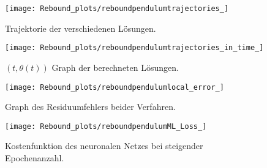 \begin{figure}
       \centering
       \texttt{[image: Rebound\_plots/reboundpendulumtrajectories\_]}
       \caption{Trajektorie der verschiedenen Lösungen.}
       \label{fig:rebound-trajectories}
\end{figure}

\begin{figure}
       \centering
       \texttt{[image: Rebound\_plots/reboundpendulumtrajectories\_in\_time\_]}
       \caption{$(t, \theta(t))$ Graph der berechneten Lösungen.}
       \label{fig:rebound-trajectories-in-time}
\end{figure}

\begin{figure}
       \centering
       \texttt{[image: Rebound\_plots/reboundpendulumlocal\_error\_]}
       \caption{Graph des Residuumfehlers beider Verfahren.}
       \label{fig:rebound-residuum}
\end{figure}

\begin{figure}
       \centering
       \texttt{[image: Rebound\_plots/reboundpendulumML\_Loss\_]}
       \caption{Kostenfunktion des neuronalen Netzes bei steigender Epochenanzahl.}
       \label{fig:rebound-loss}
\end{figure}

